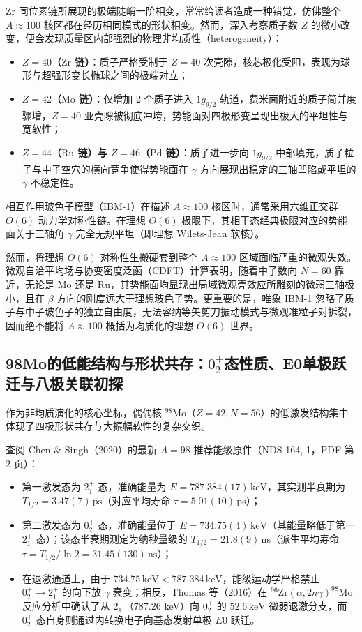 Zr 同位素链所展现的极端陡峭一阶相变，常常给读者造成一种错觉，仿佛整个 $A\approx 100$ 核区都在经历相同模式的形状相变。然而，深入考察质子数 $Z$ 的微小改变，便会发现质量区内部强烈的物理非均质性（heterogeneity）：
\begin{itemize}
\item \textbf{$Z=40$（$\mathrm{Zr}$ 链）}：质子严格受制于 $Z=40$ 次壳隙，核芯极化受阻，表现为球形与超强形变长椭球之间的极端对立；
\item \textbf{$Z=42$（$\mathrm{Mo}$ 链）}：仅增加 2 个质子进入 $1g_{9/2}$ 轨道，费米面附近的质子简并度骤增，$Z=40$ 亚壳隙被彻底冲垮，势能面对四极形变呈现出极大的平坦性与宽软性；
\item \textbf{$Z=44$（$\mathrm{Ru}$ 链）与 $Z=46$（$\mathrm{Pd}$ 链）}：质子进一步向 $1g_{9/2}$ 中部填充，质子粒子与中子空穴的横向竞争使得势能面在 $\gamma$ 方向展现出稳定的三轴凹陷或平坦的 $\gamma$ 不稳定性。
\end{itemize}

相互作用玻色子模型（IBM-1）在描述 $A\approx 100$ 核区时，通常采用六维正交群 $O(6)$ 动力学对称性链。在理想 $O(6)$ 极限下，其相干态经典极限对应的势能面关于三轴角 $\gamma$ 完全无规平坦（即理想 Wilets-Jean 软核）。

然而，将理想 $O(6)$ 对称性生搬硬套到整个 $A\approx 100$ 区域面临严重的微观失效。微观自洽平均场与协变密度泛函（CDFT）计算表明，随着中子数向 $N=60$ 靠近，无论是 $\mathrm{Mo}$ 还是 $\mathrm{Ru}$，其势能面均显现出局域微观壳效应所雕刻的微弱三轴极小，且在 $\beta$ 方向的刚度远大于理想玻色子势。更重要的是，唯象 IBM-1 忽略了质子与中子玻色子的独立自由度，无法容纳等矢剪刀振动模式与微观准粒子对拆裂，因而绝不能将 $A\approx 100$ 概括为均质化的理想 $O(6)$ 世界。

\subsection{98Mo的低能结构与形状共存：$0^+_2$态性质、E0单极跃迁与八极关联初探}\label{sec:4-3-3}

作为非均质演化的核心坐标，偶偶核 $^{98}\mathrm{Mo}$（$Z=42, N=56$）的低激发结构集中体现了四极形状共存与大振幅软性的复杂交织。

查阅 Chen \& Singh（2020）\cite{chen-singh-2020-nds-98mo}的最新 $A=98$ 推荐能级原件（NDS 164, 1，PDF 第 2 页）：
\begin{itemize}
\item 第一激发态为 $2^+_1$ 态，准确能量为 $E = 787.384(17)\,\mathrm{keV}$，其实测半衰期为 $T_{1/2} = 3.47(7)\,\mathrm{ps}$（对应平均寿命 $\tau = 5.01(10)\,\mathrm{ps}$）；
\item 第二激发态为 $0^+_2$ 态，准确能量位于 $E = 734.75(4)\,\mathrm{keV}$（其能量略低于第一 $2^+_1$ 态）；该态半衰期测定为纳秒量级的 $T_{1/2} = 21.8(9)\,\mathrm{ns}$（派生平均寿命 $\tau = T_{1/2}/\ln 2 = 31.45(130)\,\mathrm{ns}$）；
\item 在退激通道上，由于 $734.75\,\mathrm{keV} < 787.384\,\mathrm{keV}$，能级运动学严格禁止 $0^+_2 \to 2^+_1$ 的向下放 $\gamma$ 衰变；相反，Thomas 等（2016）\cite{thomas-2016-96-98mo-coexistence}在 $^{96}\mathrm{Zr}(\alpha, 2n\gamma)^{98}\mathrm{Mo}$ 反应分析中确认了从 $2^+_1$（787.26 keV）向 $0^+_2$ 的 $52.6\,\mathrm{keV}$ 微弱退激分支，而 $0^+_2$ 态自身则通过内转换电子向基态发射单极 $E0$ 跃迁。
\end{itemize}

